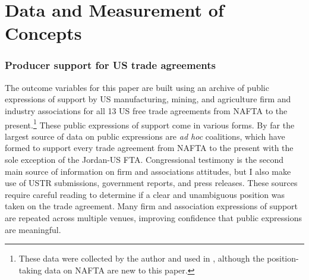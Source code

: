 \documentclass[hidelinks,12pt,letter]{article}
\begin{document}
\section*{Data and Measurement of Concepts}

\subsubsection*{Producer support for US trade agreements}
The outcome variables for this paper are built using an archive of public expressions of support by US manufacturing, mining, and agriculture firm and industry associations for all 13 US free trade agreements from NAFTA to the present.\footnote{These data were collected by the author and used in \citealt{osgood2017breakdown}, although the position-taking data on NAFTA are new to this paper.} 
These public expressions of support come in various forms. By far the largest source of data on public expressions are \emph{ad hoc} coalitions, which have formed to support every trade agreement from NAFTA to the present with the sole exception of the Jordan-US FTA. %
Congressional testimony is the second main source of information on firm and associations attitudes, but I also make use of USTR submissions, government reports, and press releases. These sources require careful reading to determine if a clear and unambiguous position was taken on the trade agreement. %
Many firm and association expressions of support are repeated across multiple venues, improving confidence that public expressions are meaningful.
\end{document}
